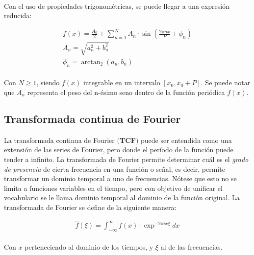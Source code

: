 \documentclass[12pt, twocolumn]{article}
\begin{document}
	\paragraph{} Con el uso de propiedades trigonométricas, se puede llegar a una expresión reducida:
	
	\begin{align}
		f(x) = \frac{A_{0}}{2} + \sum_{n=1}^{N}A_{n}\cdot\sin(\frac{2\pi nx}{P} + \phi_{n}) \\
		A_{n} = \sqrt{a_{n}^{2}+b_{n}^{2}} \\
		\phi_{n} = \arctan_{2}(a_{n},b_{n})
	\end{align}
	
	\paragraph{} Con $N\ge1$, siendo $f(x)$ integrable en un intervalo $\left[x_{0}, x_{0}+P\right]$. Se puede notar que $A_{n}$ representa el peso del n-ésimo seno dentro de la función periódica $f(x)$.
	
	\subsection{Transformada continua de Fourier}
	
	\paragraph{} La transformada continua de Fourier $($\textbf{TCF}$)$ puede ser entendida como una extensión de las series de Fourier, pero donde el período de la función puede tender a infinito. La transformada de Fourier permite determinar cuál es el \textit{grado de presencia} de cierta frecuencia en una función o señal, es decir, permite transformar un dominio temporal a uno de frecuencias. Nótese que esto no se limita a funciones variables en el tiempo, pero con objetivo de unificar el vocabulario se le llama dominio temporal al dominio de la función original. La transformada de Fourier se define de la siguiente manera:
	
	\begin{align}
		\hat{f}(\xi) = \int_{-\infty}^{\infty} f(x)\cdot\exp^{-2\pi i x\xi} dx
	\end{align}
	
	\paragraph{} Con $x$ perteneciendo al dominio de los tiempos, y $\xi$ al de las frecuencias.
	
\end{document}
